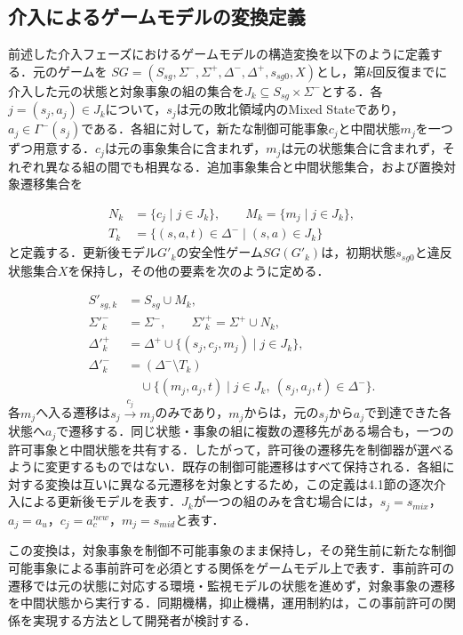 \subsection{介入によるゲームモデルの変換定義}
\label{sec:proposal_definition}

前述した介入フェーズにおけるゲームモデルの構造変換を以下のように定義する．元のゲームを $SG = (S_{sg}, \Sigma^{-}, \Sigma^{+}, \Delta^{-}, \Delta^{+}, s_{sg0}, X)$とし，第$k$回反復までに介入した元の状態と対象事象の組の集合を$J_k\subseteq S_{sg}\times\Sigma^{-}$とする．各$j=(s_j,a_j)\in J_k$について，$s_j$は元の敗北領域内のMixed Stateであり，$a_j\in\Gamma^{-}(s_j)$である．各組に対して，新たな制御可能事象$c_j$と中間状態$m_j$を一つずつ用意する．$c_j$は元の事象集合に含まれず，$m_j$は元の状態集合に含まれず，それぞれ異なる組の間でも相異なる．追加事象集合と中間状態集合，および置換対象遷移集合を

\[

\begin{aligned}
N_k&=\{c_j\mid j\in J_k\},\qquad M_k=\{m_j\mid j\in J_k\},\\
T_k&=\{(s,a,t)\in\Delta^{-}\mid(s,a)\in J_k\}
\end{aligned}
\]
と定義する．更新後モデル$G'_k$の安全性ゲーム$SG(G'_k)$は，初期状態$s_{sg0}$と違反状態集合$X$を保持し，その他の要素を次のように定める．

\[
\begin{aligned}
S'_{sg,k}&=S_{sg}\cup M_k,\\
\Sigma'^{-}_k&=\Sigma^{-},\qquad\Sigma'^{+}_k=\Sigma^{+}\cup N_k,\\
\Delta'^{+}_k&=\Delta^{+}\cup\{(s_j,c_j,m_j)\mid j\in J_k\},\\
\Delta'^{-}_k&=(\Delta^{-}\setminus T_k)\\
&\quad\cup\{(m_j,a_j,t)\mid j\in J_k,\ (s_j,a_j,t)\in\Delta^{-}\}.
\end{aligned}
\]
各$m_j$へ入る遷移は$s_j\xrightarrow{c_j}m_j$のみであり，$m_j$からは，元の$s_j$から$a_j$で到達できた各状態へ$a_j$で遷移する．同じ状態・事象の組に複数の遷移先がある場合も，一つの許可事象と中間状態を共有する．したがって，許可後の遷移先を制御器が選べるように変更するものではない．既存の制御可能遷移はすべて保持される．各組に対する変換は互いに異なる元遷移を対象とするため，この定義は4.1節の逐次介入による更新後モデルを表す．$J_k$が一つの組のみを含む場合には，$s_j=s_{mix}$，$a_j=a_u$，$c_j=a_c^{new}$，$m_j=s_{mid}$と表す．

この変換は，対象事象を制御不可能事象のまま保持し，その発生前に新たな制御可能事象による事前許可を必須とする関係をゲームモデル上で表す．事前許可の遷移では元の状態に対応する環境・監視モデルの状態を進めず，対象事象の遷移を中間状態から実行する．同期機構，抑止機構，運用制約は，この事前許可の関係を実現する方法として開発者が検討する．

